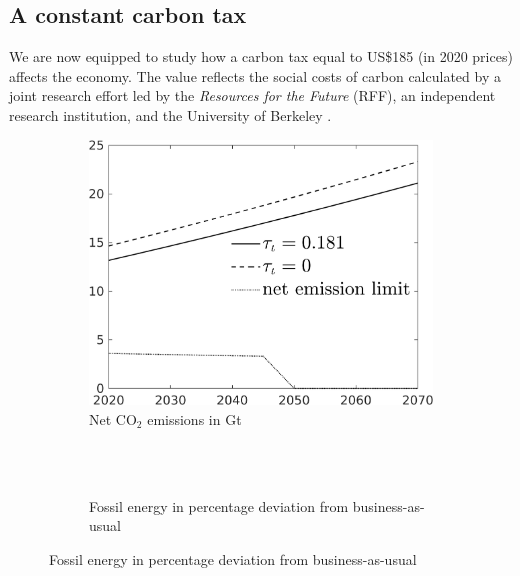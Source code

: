 \subsection{A constant carbon tax}\label{subsec:exp}


We are now equipped to study how a carbon tax  equal to US\$185 (in 2020 prices) affects the economy. The value reflects the social costs of carbon calculated by a joint research effort led by the \textit{Resources for the Future} (RFF), an independent research institution, and the University of Berkeley \citep{Rennert2022ComprehensiveCO2}. 


\begin{figure}[h!!]
	\centering
	\caption{A constant carbon tax equal to US\$185 (2020 prices) per ton of carbon  }\label{fig:Leveltauf_nsk0_xgr0_know}		
\begin{subfigure}[]{0.4\textwidth}
	\caption{Net CO$_2$ emissions in Gt \\ \ }
	\includegraphics[width=1\textwidth]{../../codding_model/own_basedOnFried/optimalPol_010922_revision/figures/all_13Sept22/CompTauf_bytaul_Reg5_Emnet_spillover0_nsk0_xgr0_knspil0_sep0_LFlimit0_emsbase0_countec0_GovRev0_etaa0.79_lgd1.png}
\end{subfigure}	
 \begin{minipage}[]{0.1\textwidth}
	\
\end{minipage}
\begin{subfigure}[]{0.4\textwidth}
\caption{Fossil energy in percentage deviation from business-as-usual}

\end{subfigure}
\end{figure}
